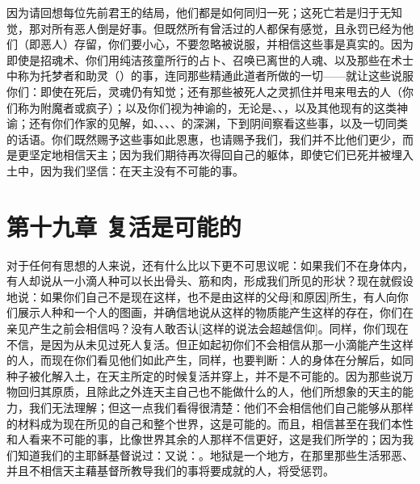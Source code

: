 因为请回想每位先前君王的结局，他们都是如何同归一死；这死亡若是归于无知觉，那对所有恶人倒是好事。但既然所有曾活过的人都保有感觉，且永罚已经为他们（即恶人）存留，你们要小心，不要忽略被说服，并相信这些事是真实的。因为即使是招魂术、你们用纯洁孩童所行的占卜、召唤已离世的人魂、以及那些在术士中称为托梦者和助灵（）的事，连同那些精通此道者所做的一切——就让这些说服你们：即使在死后，灵魂仍有知觉；还有那些被死人之灵抓住并甩来甩去的人（你们称为附魔者或疯子）；以及你们视为神谕的，无论是、、，以及其他现有的这类神谕；还有你们作家的见解，如、、、、的深渊，下到阴间察看这些事，以及一切同类的话语。你们既然赐予这些事如此恩惠，也请赐予我们，我们并不比他们更少，而是更坚定地相信天主；因为我们期待再次得回自己的躯体，即使它们已死并被埋入土中，因为我们坚信：在天主没有不可能的事。\par


\section{第十九章 复活是可能的}

对于任何有思想的人来说，还有什么比以下更不可思议呢：如果我们不在身体内，有人却说从一小滴人种可以长出骨头、筋和肉，形成我们所见的形状？现在就假设地说：如果你们自己不是现在这样，也不是由这样的父母[和原因]所生，有人向你们展示人种和一个人的图画，并确信地说从这样的物质能产生这样的存在，你们在亲见产生之前会相信吗？没有人敢否认[这样的说法会超越信仰]。同样，你们现在不信，是因为从未见过死人复活。但正如起初你们不会相信从那一小滴能产生这样的人，而现在你们看见他们如此产生，同样，也要判断：人的身体在分解后，如同种子被化解入土，在天主所定的时候复活并穿上，并不是不可能的。因为那些说万物回归其原质，且除此之外连天主自己也不能做什么的人，他们所想象的天主的能力，我们无法理解；但这一点我们看得很清楚：他们不会相信他们自己能够从那样的材料成为现在所见的自己和整个世界，这是可能的。而且，相信甚至在我们本性和人看来不可能的事，比像世界其余的人那样不信更好，这是我们所学的；因为我们知道我们的主耶稣基督说过：又说：。地狱是一个地方，在那里那些生活邪恶、并且不相信天主藉基督所教导我们的事将要成就的人，将受惩罚。\par


